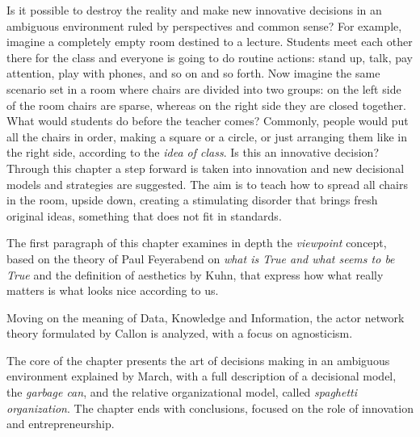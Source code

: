 Is it possible to destroy the reality and make new innovative decisions in an ambiguous environment ruled by perspectives and common sense? For example, imagine a completely empty room destined to a lecture. Students meet each other there for the class and everyone is going to do routine actions: stand up, talk, pay attention, play with phones, and so on and so forth. Now imagine the same scenario set in a room where chairs are divided into two groups: on the left side of the room chairs are sparse, whereas on the right side they are closed together. What would students do before the teacher comes? Commonly, people would put all the chairs in order, making a square or a circle, or just arranging them like in the right side, according to the \textit{idea of class}. Is this an innovative decision? Through this chapter a step forward is taken into innovation and new decisional models and strategies are suggested. The aim is to teach how to spread all chairs in the room, upside down, creating a stimulating disorder that brings fresh original ideas, something that does not fit in standards.

The first paragraph of this chapter examines in depth the \textit{viewpoint} concept, based on the theory of Paul Feyerabend on \textit{what is True and what seems to be True} and the definition of aesthetics by Kuhn, that express how what really matters is what looks nice according to us.

Moving on the meaning of Data, Knowledge and Information, the actor network theory formulated by Callon is analyzed, with a focus on agnosticism.

The core of the chapter presents the art of decisions making in an ambiguous environment explained by March, with a full description of a decisional model, the \textit{garbage can}, and the relative organizational model, called \textit{spaghetti organization}. The chapter ends with conclusions, focused on the role of innovation and entrepreneurship.
